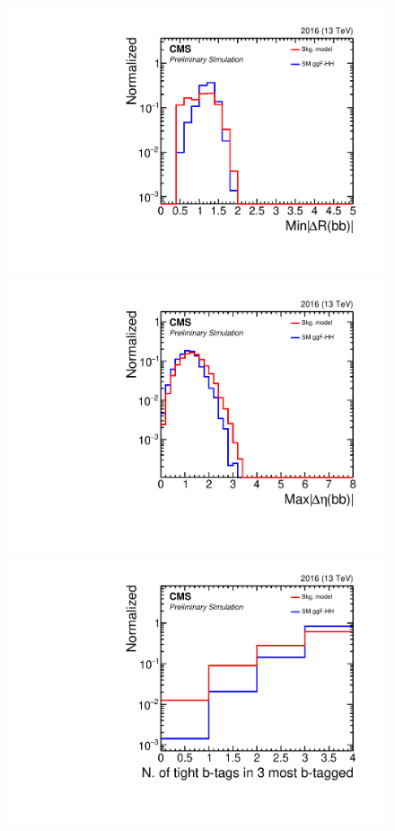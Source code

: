 \begin{figure}[ht!]
\begin{center}
\includegraphics[width=0.245\linewidth]{Figures/AnalysisStrategy/signalobservables/ggfcategories//2016ggfmva1/plot_2016_h_min_4b_deltaR.pdf}
\includegraphics[width=0.245\linewidth]{Figures/AnalysisStrategy/signalobservables/ggfcategories//2016ggfmva1/plot_2016_h_max_4b_deltaEta.pdf}
\includegraphics[width=0.245\linewidth]{Figures/AnalysisStrategy/signalobservables/ggfcategories//2016ggfmva1/plot_2016_h_nBtagTight.pdf}
\end{center}
\end{figure}

\clearpage

